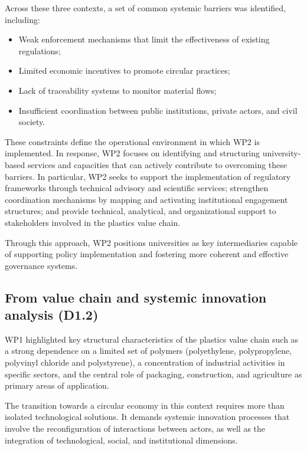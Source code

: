 \documentclass[
  12pt,
  oneside]{book}
\providecommand{\tightlist}{%
  \setlength{\itemsep}{0pt}\setlength{\parskip}{0pt}}
\begin{document}
Across these three contexts, a set of common systemic barriers was
identified, including:

\begin{itemize}
\tightlist
\item
  Weak enforcement mechanisms that limit the effectiveness of existing
  regulations;
\item
  Limited economic incentives to promote circular practices;
\item
  Lack of traceability systems to monitor material flows;
\item
  Insufficient coordination between public institutions, private actors,
  and civil society.
\end{itemize}

These constraints define the operational environment in which WP2 is
implemented. In response, WP2 focuses on identifying and structuring
university-based services and capacities that can actively contribute to
overcoming these barriers. In particular, WP2 seeks to support the
implementation of regulatory frameworks through technical advisory and
scientific services; strengthen coordination mechanisms by mapping and
activating institutional engagement structures; and provide technical,
analytical, and organizational support to stakeholders involved in the
plastics value chain.

Through this approach, WP2 positions universities as key intermediaries
capable of supporting policy implementation and fostering more coherent
and effective governance systems.

\subsection{From value chain and systemic innovation analysis
(D1.2)}\label{from-value-chain-and-systemic-innovation-analysis-d1.2}

WP1 highlighted key structural characteristics of the plastics value
chain such as a strong dependence on a limited set of polymers
(polyethylene, polypropylene, polyvinyl chloride and polystyrene), a
concentration of industrial activities in specific sectors, and the
central role of packaging, construction, and agriculture as primary
areas of application.

The transition towards a circular economy in this context requires more
than isolated technological solutions. It demands systemic innovation
processes that involve the reconfiguration of interactions between
actors, as well as the integration of technological, social, and
institutional dimensions.
\end{document}

